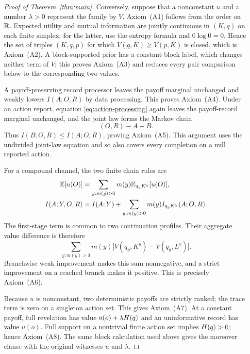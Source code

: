 \begin{proof}[Proof of Theorem~\ref{thm:main}]
Conversely, suppose that a nonconstant $u$ and a number $\lambda>0$ represent
the family by $V$.  Axiom~\textup{(A1)} follows from the order on $\mathbb R$.
Expected utility and mutual information are jointly continuous in $(K,q)$ on
each finite simplex; for the latter, use the entropy formula and $0\log0=0$.
Hence the set of triples $(K,q,p)$ for which $V(q,K)\ge V(p,K)$ is closed,
which is Axiom~\textup{(A2)}.  A block-supported prior has a constant block
label, which changes neither term of $V$; this proves Axiom~\textup{(A3)} and
reduces every pair comparison below to the corresponding two values.

A payoff-preserving record processor leaves the payoff marginal unchanged and
weakly lowers $I(A;O,R)$ by data processing.  This proves
Axiom~\textup{(A4)}.  Under an action report, equation
\eqref{eq:action-processing} again leaves the payoff-record marginal unchanged,
and the joint law forms the Markov chain
\[
(O,R)-A-B.
\]
Thus $I(B;O,R)\le I(A;O,R)$, proving Axiom~\textup{(A5)}.  This argument uses
the undivided joint-law equation and so also covers every completion on a null
reported action.

For a compound channel, the two finite chain rules are
\begin{align*}
\mathbb E[u(O)]
  &=\sum_{y:m(y)>0} m(y)\mathbb E_{q_yK^y}[u(O)],\\
I(A;Y,O,R)
  &=I(A;Y)+\sum_{y:m(y)>0} m(y)I_{q_yK^y}(A;O,R).
\end{align*}
The first-stage term is common to two continuation profiles.  Their aggregate
value difference is therefore
\[
\sum_{y:m(y)>0} m(y)\bigl[V(q_y,K^y)-V(q_y,L^y)\bigr].
\]
Branchwise weak improvement makes this sum nonnegative, and a strict
improvement on a reached branch makes it positive.  This is precisely
Axiom~\textup{(A6)}.

Because $u$ is nonconstant, two deterministic payoffs are strictly ranked; the
trace term is zero on a singleton action set.  This gives
Axiom~\textup{(A7)}.  At a constant payoff, full revelation has
value $u(o)+\lambda H(q)$ and an uninformative record has value $u(o)$.
Full support on a nontrivial finite action set implies $H(q)>0$; hence
Axiom~\textup{(A8)}.  The same block calculation used above gives the moreover
clause with the original witnesses $u$ and $\lambda$.
\end{proof}
